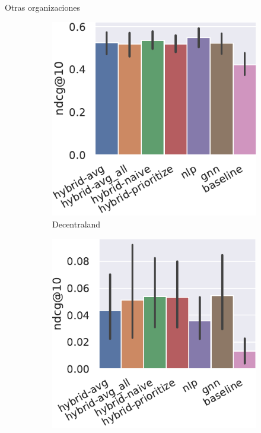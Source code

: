 \begin{frame}{Otras organizaciones}
\begin{figure}
    \centering
    \begin{subfigure}{.24\linewidth}
        \includegraphics[width=\linewidth]{./images/graphs/7_all-metrics-Decentraland-ndcg@10.pdf}
        \caption{Decentraland}
    \end{subfigure}\hfill\begin{subfigure}{.24\linewidth}
        \includegraphics[width=\linewidth]{./images/graphs/7_all-metrics-DEAD FoundationsDAO-ndcg@10.pdf}

\end{subfigure}
\end{figure}
\end{frame}
